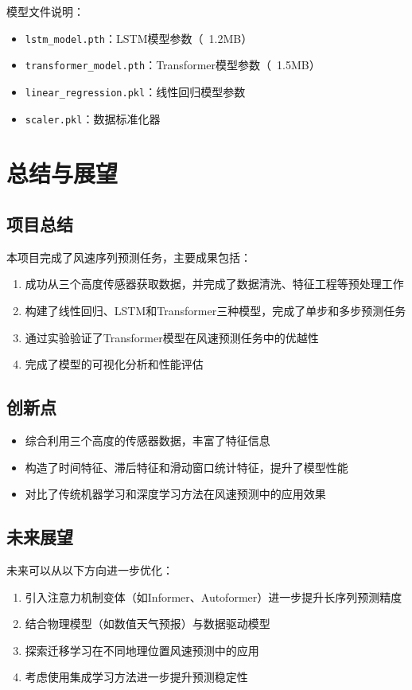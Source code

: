 \documentclass[12pt,a4paper]{article}
\begin{document}
模型文件说明：
\begin{itemize}
    \item \texttt{lstm\_model.pth}：LSTM模型参数（~1.2MB）
    \item \texttt{transformer\_model.pth}：Transformer模型参数（~1.5MB）
    \item \texttt{linear\_regression.pkl}：线性回归模型参数
    \item \texttt{scaler.pkl}：数据标准化器
\end{itemize}

\newpage

\section{总结与展望}

\subsection{项目总结}
本项目完成了风速序列预测任务，主要成果包括：

\begin{enumerate}
    \item 成功从三个高度传感器获取数据，并完成了数据清洗、特征工程等预处理工作
    \item 构建了线性回归、LSTM和Transformer三种模型，完成了单步和多步预测任务
    \item 通过实验验证了Transformer模型在风速预测任务中的优越性
    \item 完成了模型的可视化分析和性能评估
\end{enumerate}

\subsection{创新点}
\begin{itemize}
    \item 综合利用三个高度的传感器数据，丰富了特征信息
    \item 构造了时间特征、滞后特征和滑动窗口统计特征，提升了模型性能
    \item 对比了传统机器学习和深度学习方法在风速预测中的应用效果
\end{itemize}

\subsection{未来展望}
未来可以从以下方向进一步优化：
\begin{enumerate}
    \item 引入注意力机制变体（如Informer、Autoformer）进一步提升长序列预测精度
    \item 结合物理模型（如数值天气预报）与数据驱动模型
    \item 探索迁移学习在不同地理位置风速预测中的应用
    \item 考虑使用集成学习方法进一步提升预测稳定性
\end{enumerate}
\end{document}
